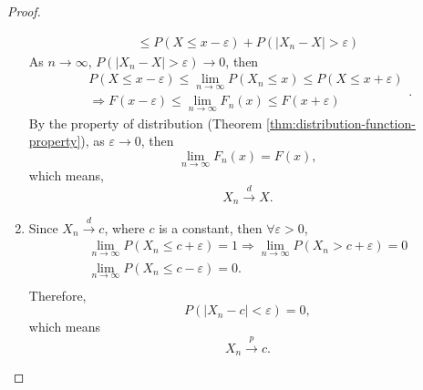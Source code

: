 \begin{proof}
\begin{enumerate}
\begin{equation*}
\begin{gathered}
                      \leq P\left(X\leq x-\varepsilon\right)+P\left(|X_n-X|>\varepsilon\right)
                  \end{gathered}
              \end{equation*}
              As $n\rightarrow\infty$, $P\left(|X_n-X|>\varepsilon\right)\rightarrow 0$, then
              \begin{equation*}
                  \begin{gathered}
                      P\left(X\leq x-\varepsilon\right)\leq\lim_{n\rightarrow\infty}P\left(X_n\leq x\right)\leq P\left(X\leq x+\varepsilon\right) \\
                      \Rightarrow F(x-\varepsilon)\leq \lim_{n\rightarrow\infty}F_n(x)\leq F(x+\varepsilon)
                  \end{gathered}.
              \end{equation*}
              By the property of distribution (Theorem \ref{thm:distribution-function-property}), as $\varepsilon\rightarrow 0$, then
              \begin{equation*}
                  \lim_{n\rightarrow\infty}F_n(x)=F(x),
              \end{equation*}
              which means,
              \begin{equation*}
                  X_n\stackrel{d}{\rightarrow}X.
              \end{equation*}
        \item
              Since $X_{n}\stackrel{d}{\rightarrow}c$, where $c$ is a constant, then $\forall\varepsilon>0$,
              \begin{equation*}
                  \begin{gathered}
                      \lim_{n\rightarrow\infty}P(X_n\leq c+\varepsilon)=1\Rightarrow\lim_{n\rightarrow\infty}P(X_n>c+\varepsilon)=0\\
                      \lim_{n\rightarrow\infty}P(X_n\leq c-\varepsilon)=0.\\
                  \end{gathered}
              \end{equation*}
              Therefore,
              \begin{equation*}
                  P\left(\left|X_n-c\right|<\varepsilon\right)=0,
              \end{equation*}
              which means
              \begin{equation*}
                  X_n\stackrel{p}{\rightarrow}c.
              \end{equation*}
    \end{enumerate}
\end{proof}

